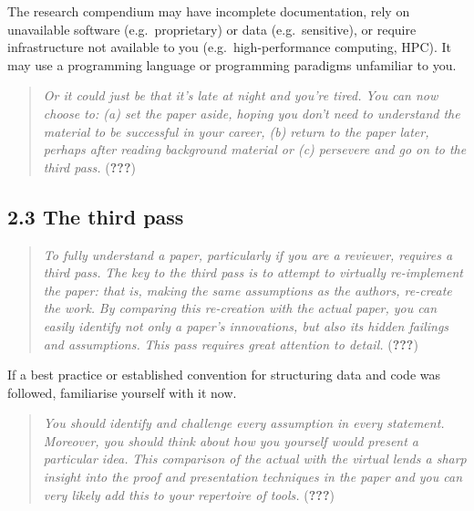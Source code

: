 \documentclass[twocolumn]{article}
\begin{document}
The research compendium may have incomplete documentation, rely on
unavailable software (e.g.~proprietary) or data (e.g.~sensitive), or
require infrastructure not available to you (e.g.~high-performance
computing, HPC). It may use a programming language or programming
paradigms unfamiliar to you.

\begin{quote}
\emph{Or it could just be that it's late at night and you're tired.}
\emph{You can now choose to: (a) set the paper aside, hoping you don't
need to understand the material to be successful in your career, (b)
return to the paper later, perhaps after reading background material or
(c) persevere and go on to the third pass.} ({\textbf{???}})
\end{quote}

\hypertarget{the-third-pass}{%
\subsection*{2.3 The third pass}\label{the-third-pass}}

\begin{quote}
\emph{To fully understand a paper, particularly if you are a reviewer,
requires a third pass.} \emph{The key to the third pass is to attempt to
virtually re-implement the paper: that is, making the same assumptions
as the authors, re-create the work.} \emph{By comparing this re-creation
with the actual paper, you can easily identify not only a paper's
innovations, but also its hidden failings and assumptions.} \emph{This
pass requires great attention to detail.} ({\textbf{???}})
\end{quote}

If a best practice or established convention for structuring data and
code was followed, familiarise yourself with it now.

\begin{quote}
\emph{You should identify and challenge every assumption in every
statement.} \emph{Moreover, you should think about how you yourself
would present a particular idea.} \emph{This comparison of the actual
with the virtual lends a sharp insight into the proof and presentation
techniques in the paper and you can very likely add this to your
repertoire of tools.} ({\textbf{???}})
\end{quote}
\end{document}
